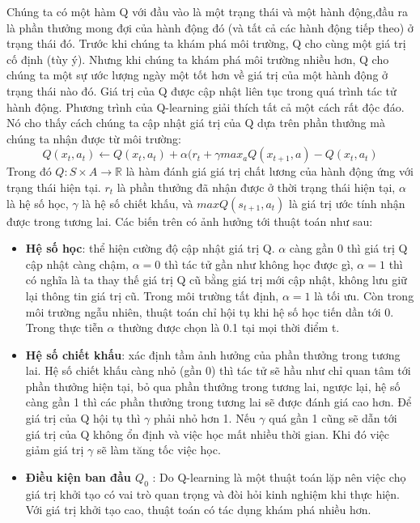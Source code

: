 \documentclass[14pt,a4paper,oneside]{report}		%
\begin{document}
Chúng ta có một hàm Q với đầu vào là một trạng thái và một hành động,đầu ra là phần thưởng mong đợi của hành động đó (và tất cả các hành động tiếp theo) ở trạng thái đó. Trước khi chúng ta khám phá môi trường, Q cho cùng một giá trị cố định (tùy ý). Nhưng khi chúng ta khám phá môi trường nhiều hơn, Q cho chúng ta một sự ước lượng ngày một tốt hơn về giá trị của một hành động ở trạng thái nào đó. Giá trị của Q được cập nhật liên tục trong quá trình tác tử hành động. 
	Phương trình của Q-learning giải thích tất cả một cách rất độc đáo. Nó cho thấy cách chúng ta cập nhật giá trị của Q dựa trên phần thưởng mà chúng ta nhận được từ môi trường:
\begin{equation}\label{eq17}
Q(x_t,a_t) \leftarrow Q(x_t,a_t)+\alpha(r_t+\gamma max_{a}Q(x_{t+1},a) - Q(x_t,a_t)
\end{equation}
Trong đó $Q:S \times A \rightarrow \mathbb{R}$ là hàm đánh giá giá trị chất lương của hành động ứng với trạng thái hiện tại. $r_t$ là phần thưởng đã nhận được ở thời trạng thái hiện tại, $\alpha$ là hệ số học, $\gamma$ là hệ số chiết khấu, và $maxQ(s_{t+1},a_t)$ là giá trị ước tính nhận được trong tương lai. Các biến trên có ảnh hưởng tới thuật toán như sau:
\begin{itemize}
\item \textbf{Hệ số học}: thể hiện cường độ cập nhật giá trị Q. $\alpha$ càng gần 0 thì giá trị Q cập nhật càng chậm, $\alpha = 0$ thì tác tử gần như không học được gì, $\alpha = 1$ thì có nghĩa là ta thay thế giá trị Q cũ bằng giá trị mới cập nhật, không lưu giữ lại thông tin giá trị cũ. Trong môi trường tất định, $\alpha=1$ là tối ưu. Còn trong môi trường ngẫu nhiên, thuật toán chỉ hội tụ khi hệ số học tiến dần tới 0. Trong thực tiễn $\alpha$ thường được chọn là 0.1 tại mọi thời điểm t.
\item \textbf{Hệ số chiết khấu}: xác định tầm ảnh hưởng của phần thưởng trong tương lai. Hệ số chiết khấu càng nhỏ (gần 0) thì tác tử sẽ hầu như chỉ quan tâm tới phần thưởng hiện tại, bỏ qua phần thưởng trong tương lai, ngược lại, hệ số càng gần 1 thì các phần thưởng trong tương lai sẽ được đánh giá cao hơn. Để giá trị của Q hội tụ thì $\gamma$ phải nhỏ hơn 1. Nếu $\gamma$ quá gần 1 cũng sẽ dẫn tới giá trị của Q không ổn định và việc học mất nhiều thời gian. Khi đó việc giảm giá trị $\gamma$ sẽ làm tăng tốc việc học.
\item \textbf{Điều kiện ban đầu $Q_0$} : Do Q-learning là một thuật toán lặp nên việc chọ giá trị khởi tạo có vai trò quan trọng và đòi hỏi kinh nghiệm khi thực hiện. Với giá trị khởi tạo cao, thuật toán có tác dụng khám phá nhiều hơn.
\end{itemize} 
\end{document}
